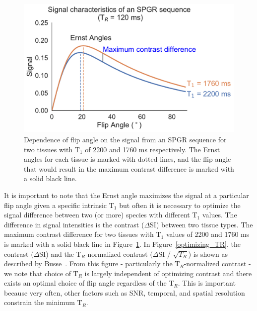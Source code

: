 \begin{figure}[htbp]
   \centering
   \includegraphics[width=\textwidth]{intro/intro-images/SPGR_plot.pdf}
   \caption{Dependence of flip angle on the signal from an SPGR sequence for two tissues with T$_1$ of 2200 and 1760 ms respectively. The Ernst angles for each tissue is marked with dotted lines, and the flip angle that would result in the maximum contrast difference is marked with a solid black line.}
   \label{spgr_plot}
\end{figure}

It is important to note that the Ernst angle maximizes the signal at a particular flip angle given a specific intrinsic T$_1$ but often it is necessary to optimize the signal difference between two (or more) species with different T$_1$ values.
The difference in signal intensities is the contrast ($\Delta$SI) between two tissue types. 
The maximum contrast difference for two tissues with T$_1$ values of 2200 and 1760 ms is marked with a solid black line in Figure~\ref{spgr_plot}.
In Figure~\ref{optimizing_TR}, the contrast ($\Delta$SI) and the T$_R$-normalized contrast ($\Delta$SI / $\sqrt{T_R}$) is shown as described by Busse~\cite{Busse:2005jt}.
From this figure - particularly the T$_R$-normalized contrast - we note that choice of T$_R$ is largely independent of optimizing contrast and there exists an optimal choice of flip angle regardless of the T$_R$.
This is important because very often, other factors such as SNR, temporal, and spatial resolution constrain the minimum T$_R$. 

